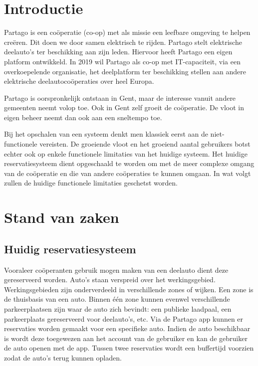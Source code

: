 \section{Introductie} %
\label{sec:introductie}
Partago is een coöperatie (co-op) met als missie een leefbare omgeving te helpen creëren. Dit doen we door samen elektrisch te rijden. Partago stelt elektrische deelauto's ter beschikking aan zijn leden. Hiervoor heeft Partago een eigen platform ontwikkeld. In 2019 wil Partago als co-op met IT-capaciteit, via een overkoepelende organisatie, het deelplatform ter beschikking stellen aan andere elektrische deelautocoöperaties over heel Europa.

Partago is oorspronkelijk ontstaan in Gent, maar de interesse vanuit andere gemeenten neemt volop toe. Ook in Gent zelf groeit de coöperatie. De vloot in eigen beheer neemt dan ook aan een sneltempo toe. 

Bij het opschalen van een systeem denkt men klassiek eerst aan de niet-functionele vereisten. De groeiende vloot en het groeiend aantal gebruikers botst echter ook op enkele functionele limitaties van het huidige systeem. Het huidige reservatiesysteem dient opgeschaald te worden om met de meer complexe omgang van de coöperatie en die van andere coöperaties te kunnen omgaan. In wat volgt zullen de huidige functionele limitaties geschetst worden. 


\section{Stand van zaken}
\label{sec:stand-van-zaken}
\subsection{Huidig reservatiesysteem}
Vooraleer coöperanten gebruik mogen maken van een deelauto dient deze gereserveerd worden. Auto's staan verspreid over het werkingsgebied. Werkingsgebieden zijn onderverdeeld in verschillende zones of wijken. Een zone is de thuisbasis van een auto. Binnen één zone kunnen evenwel verschillende parkeerplaatsen zijn waar de auto zich bevindt: een publieke laadpaal, een parkeerplaats gereserveerd voor deelauto's, etc. Via de Partago app kunnen er reservaties worden gemaakt voor een specifieke auto. Indien de auto beschikbaar is wordt deze toegewezen aan het account van de gebruiker en kan de gebruiker de auto openen met de app. Tussen twee reservaties wordt een buffertijd voorzien zodat de auto's terug kunnen opladen.   

